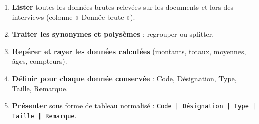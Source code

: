 \documentclass[11pt]{article}
\begin{document}
\begin{methode}
\begin{enumerate}
  \item \textbf{Lister} toutes les données brutes relevées sur les documents et lors des interviews (colonne « Donnée brute »).
  \item \textbf{Traiter les synonymes et polysèmes} : regrouper ou splitter.
  \item \textbf{Repérer et rayer les données calculées} (montants, totaux, moyennes, âges, compteurs).
  \item \textbf{Définir pour chaque donnée conservée} : Code, Désignation, Type, Taille, Remarque.
  \item \textbf{Présenter} sous forme de tableau normalisé : \texttt{Code | Désignation | Type | Taille | Remarque}.
\end{enumerate}
\end{methode}
\end{document}
